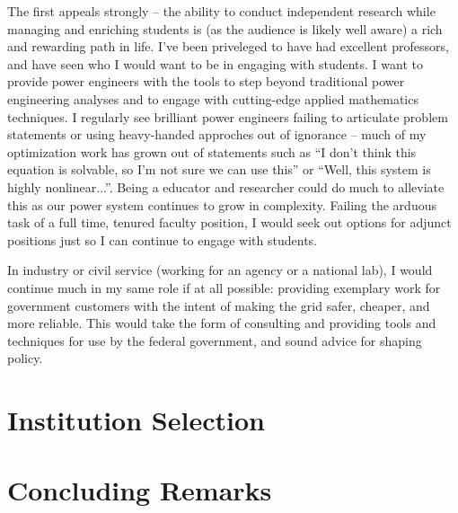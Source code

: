 \documentclass[letterpaper]{article}
\begin{document}
The first appeals strongly -- the ability to conduct independent research while managing
and enriching students is (as the audience is likely well aware) a rich and rewarding
path in life. I've been priveleged to have had excellent professors, and have seen who
I would want to be in engaging with students. I want to provide power engineers with the
tools to step beyond traditional power engineering analyses and to engage with cutting-edge
applied mathematics techniques. I regularly see brilliant power engineers
failing to articulate problem statements or using heavy-handed approches out of ignorance
-- much of my optimization work has grown out of statements such as ``I don't think this
equation is solvable, so I'm not sure we can use this''  or ``Well, this system is highly
nonlinear...''. Being a educator and researcher could do much to alleviate this as
our power system continues to grow in complexity. Failing the arduous task of
a full time, tenured faculty position, I would seek out options for adjunct positions
just so I can continue to engage with students.

In industry or civil service (working for an agency or a national lab), I would continue
much in my same role if at all possible: providing exemplary work for government customers
with the intent of making the grid safer, cheaper, and more reliable. This would take the
form of consulting and providing tools and techniques for use by the federal government,
and sound advice for shaping policy.


\section*{Institution Selection}

\section*{Concluding Remarks}
\end{document}

